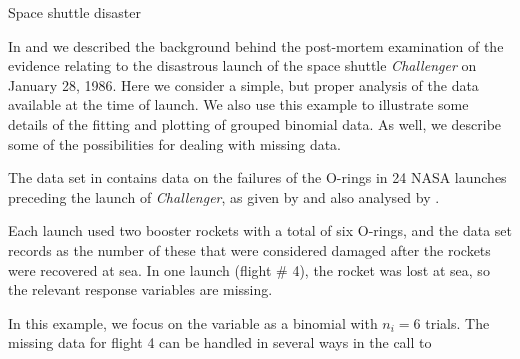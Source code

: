 \documentclass[11pt]{book}\usepackage[]{graphicx}\usepackage[]{color}
\begin{document}
\begin{Example}{Space shuttle disaster}

In  and  we described the background
behind the post-mortem examination of the evidence relating
to the disastrous launch of the space shuttle \emph{Challenger} on January 28, 1986.
Here we consider a simple, but proper analysis of the data
available at the time of launch.  We also use this example to illustrate
some details of the fitting and plotting of grouped binomial data.
As well, we describe some of the possibilities for dealing with
missing data.

The data set  in  contains
data on the failures of the O-rings in 24 NASA launches
preceding the launch of \emph{Challenger},
as given by \citet{Dalal-etal:89} and \citet{Tufte:97}
also analysed by \citet{Lavine:91}.

Each launch used two booster rockets with a total of
six O-rings, and the data set records as 
the number of these that were considered damaged after the rockets
were recovered at sea.  In one launch (flight \# 4),
the rocket was lost at sea, so the relevant response variables
are missing.

In this example, we focus on the variable 
as a binomial with $n_i = 6$ trials. The missing data for
flight 4 can be handled in several ways in the call to


\end{Example}
\end{document}
